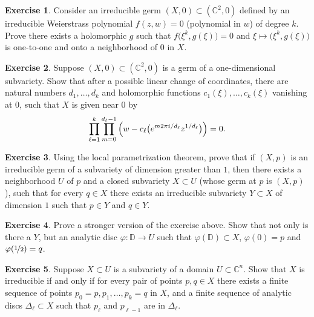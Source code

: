\documentclass[12pt,openany]{book}
\newcommand{\C}{{\mathbb{C}}}
\newcommand{\D}{{\mathbb{D}}}
\theoremstyle{plain}
\theoremstyle{remark}
\theoremstyle{definition}
\newenvironment{exbox}{%
    \def\FrameCommand{\vrule width 1pt \relax\hspace{10pt}}%
    \MakeFramed{\advance\hsize-\width\FrameRestore}%
}{%
    \endMakeFramed
}
\theoremstyle{exercise}
\newtheorem{exercise}{Exercise}[section]
\theoremstyle{example}
\begin{document}
\begin{exbox}
\begin{exercise}
\pagebreak[2]
Consider an irreducible germ
$(X,0) \subset (\C^2,0)$ defined
by an irreducible Weierstrass polynomial $f(z,w) = 0$ (polynomial in $w$)
of degree $k$.  Prove there exists a holomorphic $g$ such that
$f\bigl(\xi^k,g(\xi)\bigr) = 0$ and $\xi \mapsto \bigl(\xi^k,g(\xi)\bigr)$
is one-to-one and onto a neighborhood of $0$ in $X$.
\end{exercise}

\begin{exercise}
Suppose $(X,0) \subset (\C^2,0)$ is a germ of a one-dimensional subvariety.
Show that after a possible linear change of coordinates,
there are natural numbers
$d_1,\ldots,d_k$
and
holomorphic functions $c_1(\xi),\ldots,c_k(\xi)$ vanishing at $0$,
such that $X$ is given near $0$ by
\begin{equation*}
\prod_{\ell=1}^k \prod_{m=0}^{d_\ell-1}
{\Bigl( w - c_\ell\bigl(e^{m 2\pi i/d_\ell} z^{1/d_\ell}\bigr) \Bigr)} = 0.
\end{equation*}
\end{exercise}

\begin{exercise}
\pagebreak[2]
Using the local parametrization theorem, prove that
if $(X,p)$ is an irreducible germ of a subvariety of dimension greater
than $1$, then there exists a neighborhood $U$ of $p$ and a closed subvariety
$X \subset U$ (whose germ at $p$ is $(X,p)$), such that for every
$q \in X$ there exists an irreducible subvariety $Y \subset X$
of dimension $1$ such that $p \in Y$ and $q \in Y$.
\end{exercise}

\begin{exercise}
\pagebreak[2]
Prove a stronger version of the exercise above.  Show that not only is there
a $Y$, but an analytic disc $\varphi \colon \D \to U$ such that
$\varphi(\D) \subset X$, $\varphi(0) = p$ and $\varphi(\nicefrac{1}{2}) =
q$.
\end{exercise}

\begin{exercise}
Suppose $X \subset U$ is a subvariety of a domain $U \subset \C^n$.
Show that $X$ is irreducible
if and only if
for every pair of points $p,q \in X$ there exists a finite sequence
of points $p_0 = p, p_1, \ldots, p_k = q$ in $X$, and a finite sequence of analytic discs
$\Delta_\ell \subset X$ such that $p_{\ell}$ and $p_{\ell-1}$ are in
$\Delta_\ell$.
\end{exercise}


\end{exbox}
\end{document}
